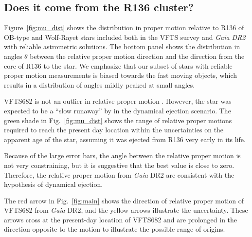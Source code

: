 \documentclass[apjl,twocolumn]{emulateapj}
\DeclareRobustCommand{\Eqref}[1]{Eq.~\ref{#1}}
\DeclareRobustCommand{\Figref}[1]{Fig.~\ref{#1}}
\begin{document}
\subsection{Does it come from the R136 cluster?}
\label{sec:r136_origin}


Figure~\ref{fig:mu_dist} shows the distribution in proper motion relative to R136
of OB-type and Wolf-Rayet stars included both in the VFTS survey and
\emph{Gaia DR2} with reliable astrometric solutions. The bottom panel
shows the distribution in angles $\theta$ between the relative proper motion
direction and the direction from the core of R136 to the star. We
emphasize that our subset of stars with reliable proper motion
measurements is biased towards the fast moving objects, which results in a
distribution of angles mildly peaked at small angles.

VFTS682 is not an outlier in relative proper motion%
. However, the star was expected to be a ``slow runaway'' by \citet{bestenlehner:11} in
the dynamical ejection scenario. The green shade in
\Figref{fig:mu_dist} shows the range of relative proper motions
required to reach the present day location within
the uncertainties on the apparent age of the star, assuming it was
ejected from R136 very early in its life.

Because of the large
error bars, the angle between the relative proper motion is not very
constraining, but it is suggestive that the best value is close to zero.
Therefore, the relative proper motion from \emph{Gaia} DR2 are consistent with the hypothesis
of dynamical ejection.





The red arrow in \Figref{fig:main} shows the direction of relative proper motion of
VFTS682 from \emph{Gaia} DR2, and the
yellow arrows illustrate the uncertainty. %
These arrows cross at the present-day location of VFTS682 and
are prolonged in the direction opposite to the motion to illustrate
the possible range of origins. %
\end{document}
